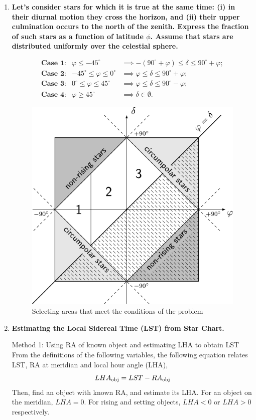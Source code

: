 \documentclass[a4paper,12pt]{extarticle}
\begin{document}
\begin{enumerate}
\item \textbf{Let’s consider stars for which it is true at the same time: (i) in their diurnal motion they cross the horizon, and (ii) their upper culmination occurs to the north of the zenith. Express the fraction of such stars as a function of latitude $\phi$. Assume that stars are distributed uniformly over the celestial sphere.}

\begin{sol}
\begin{eqnarray*}
	\textbf{Case 1:} & \varphi \leq -45^\circ & \implies -(90^\circ + \varphi) \leq \delta \leq 90^\circ + \varphi; \\
	\textbf{Case 2:} & -45^\circ \leq \varphi \leq 0^\circ & \implies \varphi \leq \delta \leq 90^\circ + \varphi; \\
	\textbf{Case 3:} & 0^\circ \leq \varphi \leq 45^\circ & \implies \varphi \leq \delta \leq 90^\circ - \varphi; \\
	\textbf{Case 4:} & \varphi \geq 45^\circ & \implies \delta \in \emptyset.
\end{eqnarray*}
\begin{figure}[H]
	\centering
	\includegraphics[width=0.5\linewidth]{circum_dia.pdf}
	\caption{Selecting areas that meet the conditions of the problem}
\end{figure}
\end{sol}

\clearpage
\item \textbf{Estimating the Local Sidereal Time (LST) from Star Chart.}

\begin{sol}

\textsf{Method 1: Using RA of known object and estimating LHA to obtain LST}\\

From the definitions of the following variables, the following equation relates LST, RA at meridian and local hour angle (LHA),
\[LHA_{\rm obj}=LST-RA_{\rm obj}\]
Then, find an object with known RA, and estimate its LHA. For an object on the meridian, $LHA = 0$. For rising and setting objects, $LHA < 0$ or $LHA > 0$ respectively.\\


\end{sol}
\end{enumerate}
\end{document}
